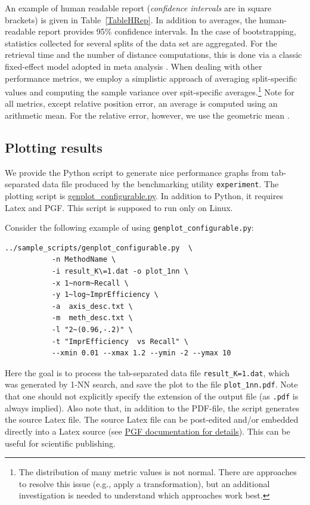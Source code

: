 \documentclass[runningheads,a4paper]{llncs}
\newcommand{\replocfile}{https://github.com/searchivarius/NonMetricSpaceLib/blob/pserv/}
\newcommand{\ttt}[1]{\texttt{#1}}
\begin{document}
{An example of human readable report (\emph{confidence intervals} are in square brackets)
is given in Table~\ref{TableHRep}.
In addition to averages, the human-readable report provides 95\% confidence intervals.
In the case of bootstrapping, statistics collected for several splits of the data set are aggregated.
For the retrieval time and the number of distance computations,
this is done via a classic fixed-effect model adopted in meta analysis \cite{Hedges_and_Vevea:1998}.
When dealing with other performance metrics, 
we employ a simplistic approach of averaging split-specific values
and computing the sample variance over spit-specific averages.\footnote{The distribution
of many metric values is not normal. There are approaches to resolve this issue (e.g., apply a transformation),
but an additional investigation is needed to understand which approaches work best.}
Note for all metrics, except relative position error, an average is computed using an arithmetic mean.
For the relative error, however, we use the geometric mean  \cite{king:1986}.


\subsection{Plotting results}\label{SectionGenPlot}
We provide the Python script to generate nice performance graphs 
from tab-separated data file produced by the 
benchmarking utility \ttt{experiment}. 
The plotting script is \href{\replocfile sample_scripts/genplot_configurable.py}{genplot\_configurable.py}.
In addition to Python, it requires Latex and PGF. 
This script is supposed to run only on Linux.

Consider the following example of using \ttt{genplot\_configurable.py}:
\begin{verbatim}
../sample_scripts/genplot_configurable.py  \
           -n MethodName \
           -i result_K\=1.dat -o plot_1nn \
           -x 1~norm~Recall \
           -y 1~log~ImprEfficiency \
           -a  axis_desc.txt \
           -m  meth_desc.txt \
           -l "2~(0.96,-.2)" \
           -t "ImprEfficiency  vs Recall" \
           --xmin 0.01 --xmax 1.2 --ymin -2 --ymax 10
\end{verbatim}
Here the goal is to process the tab-separated data file \ttt{result\_K=1.dat},
which was generated by 1-NN search, and save the plot to the file \ttt{plot\_1nn.pdf}.
Note that one should not explicitly specify the extension of the output file (as
\ttt{.pdf} is always implied). Also note that, in addition to the PDF-file,
the script generates the source Latex file. 
The source Latex file can be post-edited and/or embedded directly into a Latex source 
(see \href{http://ftp.fau.de/ctan/graphics/pgf/base/doc/pgfmanual.pdf}{PGF documentation for details}).
This can be useful for scientific publishing.


}
\end{document}
